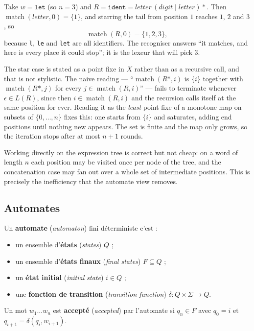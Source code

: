 \begin{example}
  Take $w = \mathtt{let}$ (so $n = 3$) and
  $R = \mathtt{ident} = \mathit{letter}\,(\mathit{digit} \mid \mathit{letter}){*}$.
  Then $\operatorname{match}(\mathit{letter}, 0) = \{1\}$, and starring the tail
  from position $1$ reaches $1$, $2$ and $3$, so
  \[
    \operatorname{match}(R, 0) = \{1, 2, 3\},
  \]
  because \texttt{l}, \texttt{le} and \texttt{let} are all identifiers. The
  recogniser answers ``it matches, and here is every place it could stop''; it
  is the lexeur that will pick $3$.
\end{example}

\begin{remark}
  The star case is stated as a point fixe in $X$ rather than as a recursive
  call, and that is not stylistic. The naive reading --- ``$\operatorname{match}(R{*},i)$
  is $\{i\}$ together with $\operatorname{match}(R{*}, j)$ for every
  $j \in \operatorname{match}(R,i)$'' --- fails to terminate whenever
  $\epsilon \in L(R)$, since then $i \in \operatorname{match}(R,i)$ and the
  recursion calls itself at the same position for ever. Reading it as the
  \emph{least} point fixe of a monotone map on subsets of
  $\{0, \ldots, n\}$ fixes this: one starts from $\{i\}$ and saturates, adding
  end positions until nothing new appears. The set is finite and the map only
  grows, so the iteration stops after at most $n+1$ rounds.
\end{remark}

\begin{remark}
  Working directly on the expression tree is correct but not cheap: on a word of
  length $n$ each position may be visited once per node of the tree, and the
  concatenation case may fan out over a whole set of intermediate positions.
  This is precisely the inefficiency that the automate view removes.
\end{remark}

\subsection{Automates}
\begin{definition}
  Un \textbf{automate} (\textit{automaton}) fini déterministe c'est :
  \begin{itemize}
    \item un ensemble d'\textbf{états} (\textit{states}) $Q$ ;
    \item un ensemble d'\textbf{états finaux} (\textit{final states})
      $F \subseteq Q$ ;
    \item un \textbf{état initial} (\textit{initial state}) $i \in Q$ ;
    \item une \textbf{fonction de transition} (\textit{transition function})
      $\delta : Q \times \Sigma \to Q$.
  \end{itemize}
  Un mot $w_1 \ldots w_n$ est \textbf{accepté} (\textit{accepted}) par
  l'automate si $q_n \in F$ avec $q_0 = i$ et $q_{i+1} = \delta(q_i, w_{i+1})$.
\end{definition}

